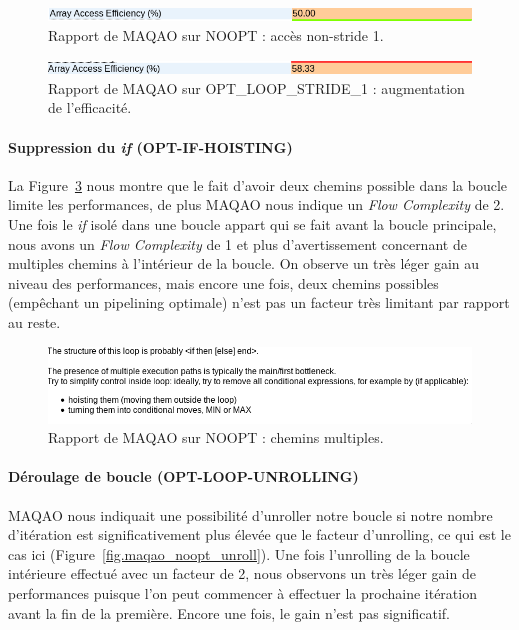 \documentclass[12pt,a4paper]{article}
\begin{document}
\begin{figure}[ht]
    \centering
    \includegraphics[scale=0.4]{./figures/L1/maqao_noopt_non-unit-stride.png}
    \caption{Rapport de MAQAO sur NOOPT : accès non-stride 1.}
    \label{fig.maqao_noopt_non-unit-stride}
\end{figure}

\begin{figure}[ht]
    \centering
    \includegraphics[scale=0.4]{./figures/L1/maqao_noopt_unit-stride.png}
    \caption{Rapport de MAQAO sur OPT\_LOOP\_STRIDE\_1 : augmentation de l'efficacité.}
    \label{fig.maqao_noopt_unit-stride}
\end{figure}

\paragraph{Suppression du \textit{if} (OPT-IF-HOISTING)} La
Figure~\ref{fig.maqao_noopt_if} nous montre que le fait d'avoir deux chemins
possible dans la boucle limite les performances, de plus MAQAO nous indique un
\textit{Flow Complexity} de 2. Une fois le \textit{if} isolé dans une boucle
appart qui se fait avant la boucle principale, nous avons un \textit{Flow
Complexity} de 1 et plus d'avertissement concernant de multiples chemins à
l'intérieur de la boucle. On observe un très léger gain au niveau des
performances, mais encore une fois, deux chemins possibles (empêchant un
pipelining optimale) n'est pas un facteur très limitant par rapport au reste.

\begin{figure}[ht]
    \centering
    \includegraphics[scale=0.4]{./figures/L1/maqao_noopt_if.png}
    \caption{Rapport de MAQAO sur NOOPT : chemins multiples.}
    \label{fig.maqao_noopt_if}
\end{figure}

\paragraph{Déroulage de boucle (OPT-LOOP-UNROLLING)}
MAQAO nous indiquait une possibilité d'unroller notre boucle si notre nombre
d'itération est significativement plus élevée que le facteur d'unrolling, ce qui
est le cas ici (Figure~\ref{fig.maqao_noopt_unroll}). Une fois l'unrolling de la
boucle intérieure effectué avec un facteur de 2, nous observons un très léger
gain de performances puisque l'on peut commencer à effectuer la prochaine
itération avant la fin de la première. Encore une fois, le gain n'est pas
significatif.
\end{document}
